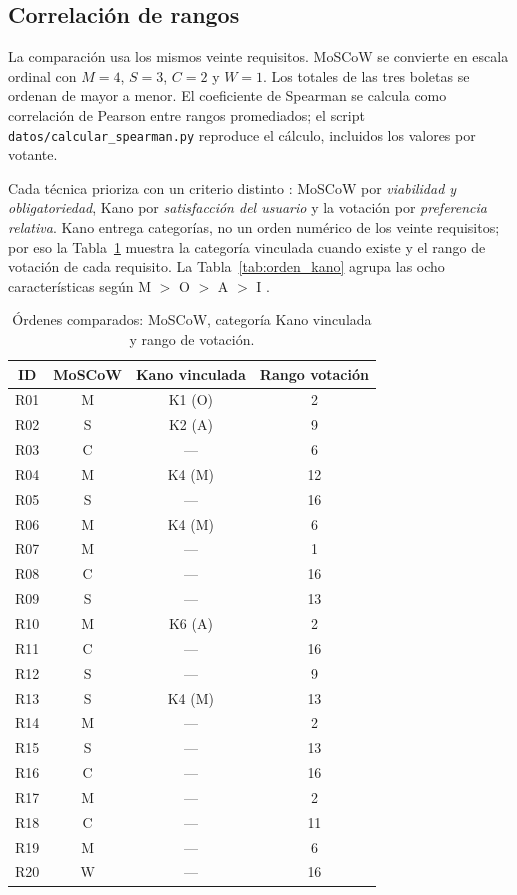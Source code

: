 ﻿\label{sec:comparacion}
\subsection{Correlación de rangos}

La comparación usa los mismos veinte requisitos. MoSCoW se convierte en escala ordinal con $M=4$, $S=3$, $C=2$ y $W=1$. Los totales de las tres boletas se ordenan de mayor a menor. El coeficiente de Spearman se calcula como correlación de Pearson entre rangos promediados; el script \texttt{datos/calcular\_spearman.py} reproduce el cálculo, incluidos los valores por votante.

Cada técnica prioriza con un criterio distinto \cite{pohl2025,laplante2022,wiegers2013}: MoSCoW por \emph{viabilidad y obligatoriedad}, Kano por \emph{satisfacción del usuario} y la votación por \emph{preferencia relativa}. Kano entrega categorías, no un orden numérico de los veinte requisitos; por eso la Tabla~\ref{tab:ordenes} muestra la categoría vinculada cuando existe y el rango de votación de cada requisito. La Tabla~\ref{tab:orden_kano} agrupa las ocho características según M $>$ O $>$ A $>$ I \cite{mkpojiogu2016}.

\begin{table}[htbp]
\centering
\footnotesize
\caption{Órdenes comparados: MoSCoW, categoría Kano vinculada y rango de votación.}
\label{tab:ordenes}
\begin{tabular}{@{}cccc@{}}
\toprule
ID & MoSCoW & Kano vinculada & Rango votación \\
\midrule
R01 & M & K1 (O) & 2 \\
R02 & S & K2 (A) & 9 \\
R03 & C & --- & 6 \\
R04 & M & K4 (M) & 12 \\
R05 & S & --- & 16 \\
R06 & M & K4 (M) & 6 \\
R07 & M & --- & 1 \\
R08 & C & --- & 16 \\
R09 & S & --- & 13 \\
R10 & M & K6 (A) & 2 \\
R11 & C & --- & 16 \\
R12 & S & --- & 9 \\
R13 & S & K4 (M) & 13 \\
R14 & M & --- & 2 \\
R15 & S & --- & 13 \\
R16 & C & --- & 16 \\
R17 & M & --- & 2 \\
R18 & C & --- & 11 \\
R19 & M & --- & 6 \\
R20 & W & --- & 16 \\
\bottomrule
\end{tabular}
\end{table}

